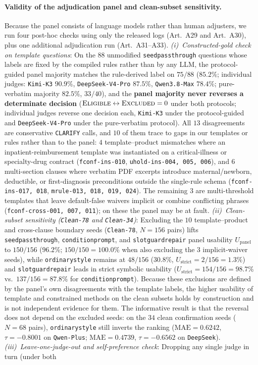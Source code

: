 \documentclass[10pt,twocolumn]{article}
\renewcommand{\_}{\textunderscore\allowbreak}
\begin{document}
\paragraph{Validity of the adjudication panel and clean-subset sensitivity.}
Because the panel consists of language models rather than human adjusters, we run four post-hoc checks using only the released logs (Art.~A29 and Art.~A30), plus one additional adjudication run (Art.~A31--A33). \emph{(i)~Constructed-gold check on template questions}: On the $88$ unmodified \texttt{seed\_passthrough} questions whose labels are fixed by the compiled rules rather than by any LLM, the protocol-guided panel majority matches the rule-derived label on $75/88$ ($85.2\%$; individual judges: \texttt{Kimi-K3} $90.9\%$, \texttt{DeepSeek-V4-Pro} $87.5\%$, \texttt{Qwen3.8-Max} $78.4\%$; pure-verbatim majority $82.5\%$, $33/40$), and the \textbf{panel majority never reverses a determinate decision} ($\textsc{Eligible}\leftrightarrow\textsc{Excluded}=0$ under both protocols; individual judges reverse one decision each, \texttt{Kimi-K3} under the protocol-guided and \texttt{DeepSeek-V4-Pro} under the pure-verbatim protocol). All $13$ disagreements are conservative \texttt{CLARIFY} calls, and $10$ of them trace to gaps in our templates or rules rather than to the panel: $4$ template--product mismatches where an inpatient-reimbursement template was instantiated on a critical-illness or specialty-drug contract (\texttt{fconf-ins-010}, \texttt{uhold-ins-004, 005, 006}), and $6$ multi-section clauses where verbatim PDF excerpts introduce maternal/newborn, deductible, or first-diagnosis preconditions outside the single-rule schema (\texttt{fconf-ins-017, 018}, \texttt{mrule-013, 018, 019, 024}). The remaining $3$ are multi-threshold templates that leave default-false waivers implicit or combine conflicting phrases (\texttt{fconf-cross-001, 007, 011}); on these the panel may be at fault. \emph{(ii)~Clean-subset sensitivity (\texttt{Clean-78} and \texttt{Clean-34})}: Excluding the $10$ template--product and cross-clause boundary seeds (\texttt{Clean-78}, $N=156$ pairs) lifts \texttt{seed\_passthrough}, \texttt{condition\_prompt}, and \texttt{slot\_guard\_repair} panel usability $U_{\text{panel}}$ to $150/156$ ($96.2\%$; $150/150 = 100.0\%$ when also excluding the $3$ implicit-waiver seeds), while \texttt{ordinary\_style} remains at $48/156$ ($30.8\%$, $U_{\text{strict}} = 2/156 = 1.3\%$) and \texttt{slot\_guard\_repair} leads in strict symbolic usability ($U_{\text{strict}} = 154/156 = 98.7\%$ vs.\ $137/156 = 87.8\%$ for \texttt{condition\_prompt}). Because these exclusions are defined by the panel's own disagreements with the template labels, the higher usability of template and constrained methods on the clean subsets holds by construction and is not independent evidence for them. The informative result is that the reversal does not depend on the excluded seeds: on the $34$ clean confirmation seeds ($N=68$ pairs), \texttt{ordinary\_style} still inverts the ranking ($\text{MAE} = 0.6242$, $\tau = -0.8001$ on \texttt{Qwen-Plus}; $\text{MAE} = 0.4739$, $\tau = -0.6562$ on \texttt{DeepSeek}). \emph{(iii)~Leave-one-judge-out and self-preference check}: Dropping any single judge in turn (under both 
\end{document}
